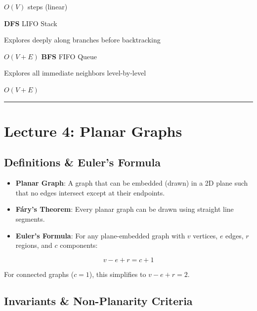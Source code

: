 \documentclass[
]{book}
\theoremstyle{definition}
\theoremstyle{definition}
\theoremstyle{definition}
\theoremstyle{definition}
\theoremstyle{remark}
\begin{document}
\textbar{} \(O(V)\) steps (linear)

\textbar{}
\textbar{} \textbf{DFS} \textbar{} LIFO Stack

\textbar{} Explores deeply along branches before backtracking

\textbar{} \(O(V + E)\) \textbar{}
\textbar{} \textbf{BFS} \textbar{} FIFO Queue

\textbar{} Explores all immediate neighbors level-by-level

\textbar{} \(O(V + E)\) \textbar{}

\begin{center}\rule{0.5\linewidth}{0.5pt}\end{center}

\section{Lecture 4: Planar Graphs}\label{lecture-4-planar-graphs}

\subsection{Definitions \& Euler's Formula}\label{definitions-eulers-formula}

\begin{itemize}
\item
  \textbf{Planar Graph}: A graph that can be embedded (drawn) in a 2D plane such that no edges intersect except at their endpoints.
\item
  \textbf{Fáry's Theorem}: Every planar graph can be drawn using straight line segments.
\item
  \textbf{Euler's Formula}: For any plane-embedded graph with \(v\) vertices, \(e\) edges, \(r\) regions, and \(c\) components:
\end{itemize}

\[v - e + r = c + 1\]

For connected graphs (\(c = 1\)), this simplifies to \(v - e + r = 2\).

\subsection{Invariants \& Non-Planarity Criteria}\label{invariants-non-planarity-criteria}
\end{document}

